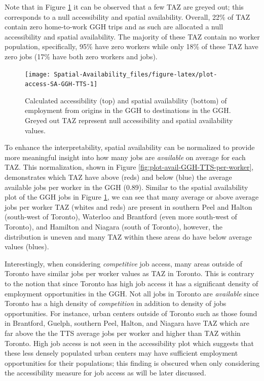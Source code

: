 \documentclass[]{elsarticle} %
\begin{document}
Note that in Figure \ref{fig:plot-access-SA-GGH-TTS} it can be observed
that a few TAZ are greyed out; this corresponds to a null accessibility
and spatial availability. Overall, 22\% of TAZ contain zero home-to-work
GGH trips and as such are allocated a null accessibility and spatial
availability. The majority of these TAZ contain no worker population,
specifically, 95\% have zero workers while only 18\% of these TAZ have
zero jobs (17\% have both zero workers and jobs).

\begin{figure}
\texttt{[image: Spatial-Availability\_files/figure-latex/plot-access-SA-GGH-TTS-1]} \caption{\label{fig:plot-access-SA-GGH-TTS}Calculated accessibility (top) and spatial availability (bottom) of employment from origins in the GGH to destinations in the GGH. Greyed out TAZ represent null accessibility and spatial availability values.}\label{fig:plot-access-SA-GGH-TTS}
\end{figure}

\newpage

To enhance the interpretability, spatial availability can be normalized
to provide more meaningful insight into how many jobs are
\emph{available} on average for each TAZ. This normalization, shown in
Figure \ref{fig:plot-avail-GGH-TTS-per-worker}, demonstrates which TAZ
have above (reds) and below (blue) the average available jobs per worker
in the GGH (0.89). Similar to the spatial availability plot of the GGH
jobs in Figure \ref{fig:plot-access-SA-GGH-TTS}, we can see that many
average or above average jobs per worker TAZ (whites and reds) are
present in southern Peel and Halton (south-west of Toronto), Waterloo
and Brantford (even more south-west of Toronto), and Hamilton and
Niagara (south of Toronto), however, the distribution is uneven and many
TAZ within these areas do have below average values (blues).

Interestingly, when considering \emph{competitive} job access, many
areas outside of Toronto have similar jobs per worker values as TAZ in
Toronto. This is contrary to the notion that since Toronto has high job
access it has a significant density of employment opportunities in the
GGH. Not all jobs in Toronto are \emph{available} since Toronto has a
high density of \emph{competition} in addition to density of jobs
opportunities. For instance, urban centers outside of Toronto such as
those found in Brantford, Guelph, southern Peel, Halton, and Niagara
have TAZ which are far above the the TTS average jobs per worker and
higher than TAZ within Toronto. High job access is not seen in the
accessibility plot which suggests that these less densely populated
urban centers may have sufficient employment opportunities for their
populations; this finding is obscured when only considering the
accessibility measure for job access as will be later discussed.
\end{document}
